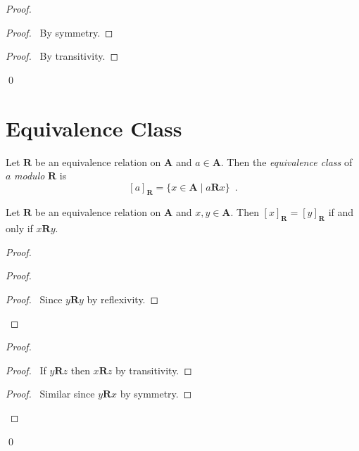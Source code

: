 \begin{proof}
    \pf
    \begin{proof}
        \pf\ By symmetry.
    \end{proof}
    \begin{proof}
        \pf\ By transitivity.
    \end{proof}
    \qed
\end{proof}

\section{Equivalence Class}

\begin{definition}
    Let $\mathbf{R}$ be an equivalence relation on $\mathbf{A}$ and $a \in \mathbf{A}$.
    Then the
    \emph{equivalence class} of $a$ \emph{modulo} $\mathbf{R}$ is
    \[ [a]_\mathbf{R} = \{ x \in \mathbf{A} \mid a\mathbf{R}x \} \enspace . \]
\end{definition}

\begin{lemma}
    \label{lemma:equivalence_classes}
    Let $\mathbf{R}$ be an equivalence relation on $\mathbf{A}$ and $x,y \in \mathbf{A}$.
    Then $[x]_\mathbf{R} = [y]_\mathbf{R}$ if and only if $x\mathbf{R}y$.
\end{lemma}

\begin{proof}
    \pf
    \begin{proof}
        \begin{proof}
            \pf\ Since $y\mathbf{R}y$ by reflexivity.
        \end{proof}
    \end{proof}
    \begin{proof}
        \begin{proof}
            \pf\ If $y\mathbf{R}z$ then $x\mathbf{R}z$ by transitivity.
        \end{proof}
        \begin{proof}
            \pf\ Similar since $y\mathbf{R}x$ by symmetry.
        \end{proof}
    \end{proof}
    \qed
\end{proof}

